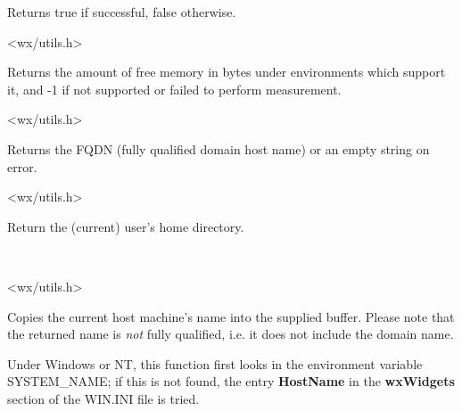 Returns true if successful, false otherwise.


<wx/utils.h>


\label{wxgetfreememory}


Returns the amount of free memory in bytes under environments which
support it, and -1 if not supported or failed to perform measurement.


<wx/utils.h>


\label{wxgetfullhostname}


Returns the FQDN (fully qualified domain host name) or an empty string on
error.




<wx/utils.h>


\label{wxgethomedir}


Return the (current) user's home directory.


\\


<wx/utils.h>


\label{wxgethostname}



Copies the current host machine's name into the supplied buffer. Please note
that the returned name is {\it not} fully qualified, i.e. it does not include
the domain name.

Under Windows or NT, this function first looks in the environment
variable SYSTEM\_NAME; if this is not found, the entry {\bf HostName}\rtfsp
in the {\bf wxWidgets} section of the WIN.INI file is tried.

